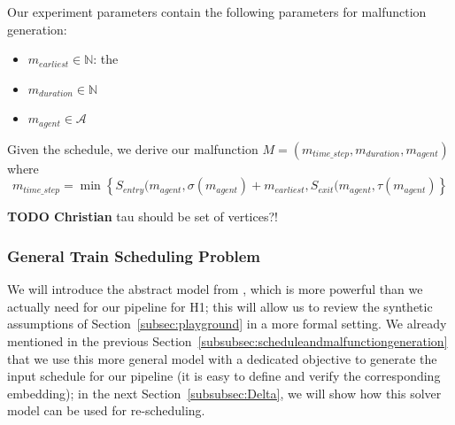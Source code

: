 \documentclass{article}
\begin{document}
Our experiment parameters contain the following parameters for malfunction generation:
\begin{itemize}
    \item $m_{earliest} \in \mathbb{N}$: the
    \item $m_{duration} \in \mathbb{N}$
    \item $m_{agent} \in \mathcal{A}$
\end{itemize}

Given the schedule, we derive our malfunction $M=(m_{time\_step},m_{duration},m_{agent})$ where
\begin{equation*}
m_{time\_step} = \min \left\{ S_{entry}(m_{agent},\sigma(m_{agent}) + m_{earliest}, S_{exit}(m_{agent},\tau(m_{agent}) \right\}
\end{equation*}

\begin{mdframed}
{\bf TODO Christian} tau should be set of vertices?!
\end{mdframed}



\subsubsection{General Train Scheduling Problem}\label{subsubsec:scheduleproblemdescription}

We will introduce the abstract model from \cite{DBLP:journals/corr/abs-2003-08598}, which is more powerful than we actually need for our pipeline for H1; this will allow us to review the synthetic assumptions of Section~\ref{subsec:playground} in a more formal setting. We already mentioned in the previous Section~\ref{subsubsec:scheduleandmalfunctiongeneration} that we use this more general model with a dedicated objective to generate the input schedule for our pipeline (it is easy to define and verify the corresponding embedding); in the next Section~\ref{subsubsec:Delta}, we will show how this solver model can be used for re-scheduling.
\end{document}
